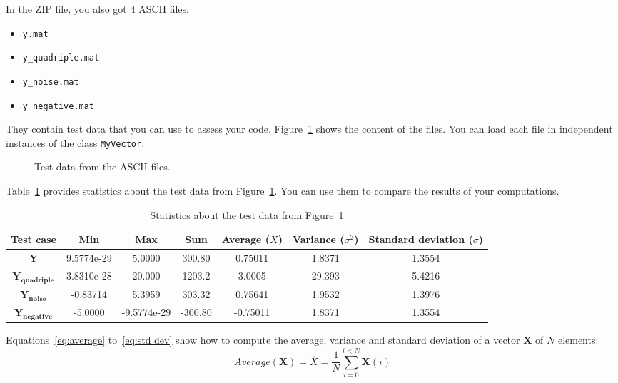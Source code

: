 \documentclass[english,a4paper,12pt,oneside]{article}
\begin{document}
In the ZIP file, you also got 4 ASCII files:
\begin{itemize}
 \item \verb+y.mat+
 \item \verb+y_quadriple.mat+
 \item \verb+y_noise.mat+
 \item \verb+y_negative.mat+
\end{itemize}
They contain test data that you can use to assess your code. 
Figure~\ref{fig:test data} shows the content of the files. 
You can load each file in independent instances of the class \verb+MyVector+. 
\begin{figure}[htb]
\centering
\scalebox{0.75}{}
 \caption{\label{fig:test data}Test data from the ASCII files.}
\end{figure}
Table~\ref{tab:test data} provides statistics about the test data from Figure~\ref{fig:test data}. 
You can use them to compare the results of your computations. 
\begin{table}[htb]
\caption{\label{tab:test data}Statistics about the test data from Figure~\ref{fig:test data}}
\centering
\begin{footnotesize}
 \begin{tabular}{|c|c|c|c|c|c|c|}
  \hline
  \textbf{Test case} & \textbf{Min} & \textbf{Max} & \textbf{Sum} & \textbf{Average} ($\overline{X}$)& \textbf{Variance} ($\sigma^2$) & \textbf{Standard deviation} ($\sigma$)\\
  \hline
  \hline
  $\mathbf{Y}$ & 9.5774e-29 & 5.0000 & 300.80 & 0.75011 & 1.8371 & 1.3554 \\
  \hline
  $\mathbf{Y_{quadriple}}$ & 3.8310e-28 & 20.000 & 1203.2 & 3.0005 & 29.393 & 5.4216 \\
  \hline
  $\mathbf{Y_{noise}}$ & -0.83714 & 5.3959 & 303.32 & 0.75641 & 1.9532 & 1.3976 \\
  \hline
  $\mathbf{Y_{negative}}$ & -5.0000 & -9.5774e-29 & -300.80 & -0.75011 & 1.8371 & 1.3554 \\
  \hline
 \end{tabular}
\end{footnotesize}
\end{table}

Equations~\ref{eq:average} to~\ref{eq:std dev} show how to compute the average, variance and standard deviation of a vector $\mathbf{X}$ of $N$ elements:
\begin{equation}
 Average(\mathbf{X}) = \overline{X} = \frac{1}{N}\sum_{i=0}^{i < N} \mathbf{X}(i)
 \label{eq:average}
\end{equation}
\end{document}
